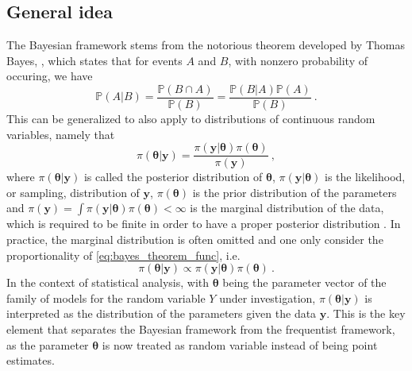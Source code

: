 \subsection{General idea} 
The Bayesian framework stems from the notorious theorem developed by Thomas Bayes, \citep{bayes_1763}, which states that for events $A$ and $B$, with nonzero probability of occuring, we have
\begin{equation}
    \label{eq:bayes_theorem}
    \mathbb{P}(A\lvert B) = \frac{\mathbb{P}(B \cap A)}{\mathbb{P}(B)} = \frac{\mathbb{P}(B\lvert A)\mathbb{P}(A)}{\mathbb{P}(B)} \ .
\end{equation}
This can be generalized to also apply to distributions of continuous random variables, namely that 
\begin{equation}
    \label{eq:bayes_theorem_func}
    \pi(\boldsymbol{\theta} \lvert \mathbf{y}) = \frac{\pi(\mathbf{y} \lvert \boldsymbol{\theta})\pi(\boldsymbol{\theta})}{\pi(\mathbf{y})} \ ,
\end{equation}
where $\pi(\boldsymbol{\theta} \lvert \mathbf{y})$ is called the posterior distribution of $\boldsymbol{\theta}$, $\pi(\mathbf{y} \lvert \boldsymbol{\theta})$ is the likelihood, or sampling, distribution of $\mathbf{y}$, $\pi(\boldsymbol{\theta})$ is the prior distribution of the parameters and $\pi(\mathbf{y}) = \int \pi(\mathbf{y} \lvert \boldsymbol{\theta}) \pi(\boldsymbol{\theta}) < \infty$ is the marginal distribution of the data, which is required to be finite in order to have a proper posterior distribution \citep{gelman2015Bayesian}.
In practice, the marginal distribution is often omitted and one only consider the proportionality of \eqref{eq:bayes_theorem_func}, i.e.
\begin{equation}
    \label{eq:bayes_theorem_func_prop}
    \pi(\boldsymbol{\theta} \lvert \mathbf{y}) \propto \pi(\mathbf{y} \lvert \boldsymbol{\theta})\pi(\boldsymbol{\theta}) \ .
\end{equation}
In the context of statistical analysis, with $\boldsymbol{\theta}$ being the parameter vector of the family of models for the random variable $Y$ under investigation, $\pi(\boldsymbol{\theta} \lvert \mathbf{y})$ is interpreted as the distribution of the parameters given the data $\mathbf{y}$.
This is the key element that separates the Bayesian framework from the frequentist framework, as the parameter $\boldsymbol{\theta}$ is now treated as random variable instead of being point estimates. 

